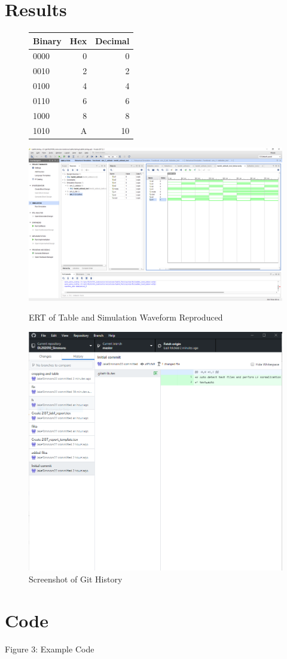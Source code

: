 \documentclass[11pt]{article}
\newcommand{\Verilog}[2][]{%
	
}
\begin{document}
\section*{Results}
\begin{figure}[ht]\centering
	\begin{tabular}{l|r|r}
		Binary & Hex & Decimal \\
		\midrule
		0000 & 0 & 0  \\
		0010 & 2 & 2 \\
		0100 & 4 & 4  \\
		0110 & 6 & 6  \\
		1000 & 8 & 8  \\
		1010 & A & 10  \\
		\bottomrule
	\end{tabular}\medskip
			
	\includegraphics[width=1\textwidth,trim={19cm 15cm 0cm 3.5cm},clip]{lab1_example_screenshot.PNG}
		\caption{ERT of Table and Simulation Waveform Reproduced}
		\label{fig:original_logo}
		
		\includegraphics[width=1\textwidth,trim={0cm 9cm 0cm 0cm},clip]{githistory.PNG}
		\caption{Screenshot of Git History}
\end{figure}
\clearpage
\section*{Code}
	\caption{Figure 3: Example Code}
	\Verilog{lab1_example_code.sv}
\end{document}
